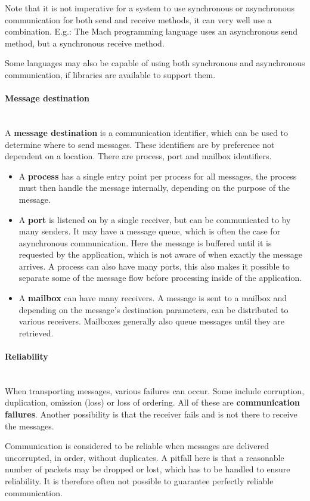 \documentclass[a4paper]{article}
\newcommand{\subsubsubsection}[1]{\paragraph{#1}\mbox{}\\}
\begin{document}
Note that it is not imperative for a system to use synchronous or asynchronous communication for both send and receive methods, it can very well use a combination. E.g.: The Mach programming language uses an asynchronous send method, but a synchronous receive method.

Some languages may also be capable of using both synchronous and asynchronous communication, if libraries are available to support them.

\subsubsubsection{Message destination}

A \textbf{message destination} is a communication identifier, which can be used to determine where to send messages. These identifiers are by preference not dependent on a location. There are process, port and mailbox identifiers.

\begin{itemize}
\item A \textbf{process} has a single entry point per process for all messages, the process must then handle the message internally, depending on the purpose of the message.
\item A \textbf{port} is listened on by a single receiver, but can be communicated to by many senders. It may have a message queue, which is often the case for asynchronous communication. Here the message is buffered until it is requested by the application, which is not aware of when exactly the message arrives. A process can also have many ports, this also makes it possible to separate some of the message flow before processing inside of the application.
\item A \textbf{mailbox} can have many receivers. A message is sent to a mailbox and depending on the message's destination parameters, can be distributed to various receivers. Mailboxes generally also queue messages until they are retrieved.
\end{itemize}

\subsubsubsection{Reliability}

When transporting messages, various failures can occur. Some include corruption, duplication, omission (loss) or loss of ordering. All of these are \textbf{communication failures}. Another possibility is that the receiver fails and is not there to receive the messages.

Communication is considered to be reliable when messages are delivered uncorrupted, in order, without duplicates. A pitfall here is that a reasonable number of packets may be dropped or lost, which has to be handled to ensure reliability. It is therefore often not possible to guarantee perfectly reliable communication.
\end{document}
